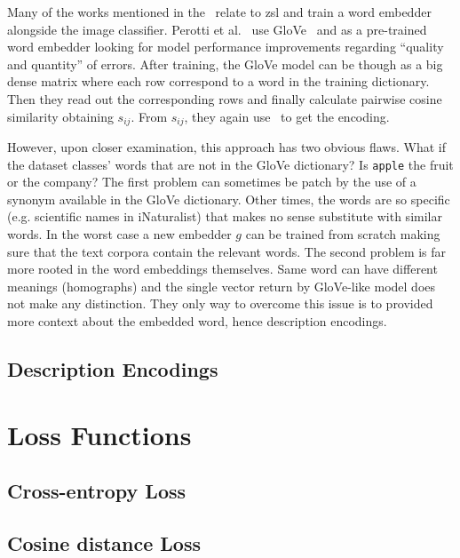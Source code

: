 Many of the works mentioned in the~ relate to
\acrshort{zsl} and train a word embedder alongside the image classifier. Perotti
et al.~\cite{BeyondOneHotPerott2023} use GloVe~\cite{GloveGlobalVPennin2014} and
as a pre-trained word embedder looking for model performance improvements
regarding ``quality and quantity'' of errors. After training, the GloVe model
can be though as a big dense matrix where each row correspond to a word in the
training dictionary. Then they read out the corresponding rows and finally
calculate pairwise cosine similarity obtaining $s_{ij}$. From $s_{ij}$, they
again use~ to get the encoding.

However, upon closer examination, this approach has two obvious flaws. What if
the dataset classes' words that are not in the GloVe dictionary? Is
\texttt{apple} the fruit or the company? The first problem can sometimes be
patch by the use of a synonym available in the GloVe dictionary. Other times,
the words are so specific (e.g. scientific names in iNaturalist) that makes no
sense substitute with similar words. In the worst case a new embedder $g$ can be
trained from scratch making sure that the text corpora contain the relevant
words. The second problem is far more rooted in the word embeddings themselves.
Same word can have different meanings (homographs) and the single vector return
by GloVe-like model does not make any distinction. They only way to overcome
this issue is to provided more context about the embedded word, hence
description encodings.

\subsection{Description Encodings}
\label{subsec:description-encodings}

\section{Loss Functions}
\label{sec:losses}

\subsection{Cross-entropy Loss}
\label{subsec:cross-entropy-loss}

\subsection{Cosine distance Loss}
\label{subsec:cosine-distance-loss}
